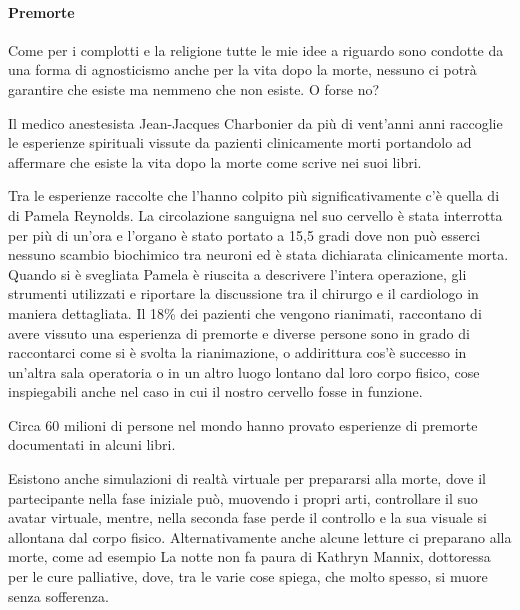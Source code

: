 \documentclass[12pt]{book} %
\begin{document}
\paragraph{Premorte}
Come per i complotti e la religione tutte le mie idee a riguardo sono condotte da una forma di agnosticismo anche per la
vita dopo la morte, nessuno ci potrà garantire che esiste ma nemmeno che non esiste. O forse no? 

Il medico anestesista Jean-Jacques Charbonier da più di vent'anni anni raccoglie le esperienze
spirituali vissute da pazienti clinicamente morti portandolo ad affermare che esiste la vita dopo la morte come scrive
nei suoi
libri.

Tra le esperienze raccolte che l'hanno colpito più significativamente c'è quella di di Pamela Reynolds. 
La circolazione sanguigna nel suo cervello è stata interrotta per più di un'ora e l'organo è stato portato a 15,5 gradi dove non può esserci nessuno scambio biochimico tra neuroni ed è stata dichiarata clinicamente morta. Quando si è svegliata Pamela è riuscita a descrivere l'intera operazione, gli strumenti utilizzati e riportare la discussione tra il chirurgo e il cardiologo in maniera dettagliata.
Il 18\% dei pazienti che vengono rianimati, raccontano di avere vissuto una esperienza di premorte e diverse persone sono in grado di raccontarci come si è svolta la rianimazione, o addirittura cos'è successo in un'altra sala operatoria o in un altro luogo lontano dal loro corpo fisico, cose inspiegabili anche nel caso in cui il nostro cervello fosse in funzione.

Circa 60 milioni di persone nel mondo hanno provato esperienze di premorte documentati in alcuni libri.

Esistono anche simulazioni di realtà virtuale per prepararsi alla morte, dove il partecipante nella fase iniziale può,
muovendo i propri arti, controllare il suo avatar virtuale, mentre, nella seconda fase perde il controllo e la sua
visuale si allontana dal corpo fisico.
Alternativamente anche alcune letture ci preparano alla morte, come ad esempio La notte non fa paura di Kathryn Mannix, dottoressa per le cure palliative, dove, tra le varie cose spiega, che molto spesso, si muore senza sofferenza.
\end{document}
